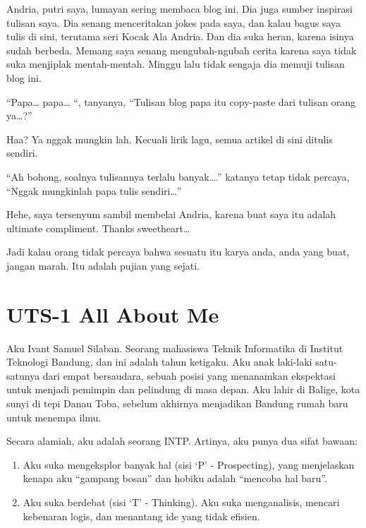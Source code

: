 \documentclass[
  letterpaper,
  DIV=11,
  numbers=noendperiod]{scrreprt}
\begin{document}
Andria, putri saya, lumayan sering membaca blog ini. Dia juga sumber
inspirasi tulisan saya. Dia senang menceritakan jokes pada saya, dan
kalau bagus saya tulis di sini, terutama seri Kocak Ala Andria. Dan dia
suka heran, karena isinya sudah berbeda. Memang saya senang
mengubah-ngubah cerita karena saya tidak suka menjiplak mentah-mentah.
Minggu lalu tidak sengaja dia memuji tulisan blog ini.

``Papa\ldots{} papa\ldots{} ``, tanyanya, ``Tulisan blog papa itu
copy-paste dari tulisan orang ya\ldots?''

Haa? Ya nggak mungkin lah. Kecuali lirik lagu, semua artikel di sini
ditulis sendiri.

``Ah bohong, soalnya tulisannya terlalu banyak\ldots.'' katanya tetap
tidak percaya, ``Nggak mungkinlah papa tulis sendiri\ldots{}''

Hehe, saya tersenyum sambil membelai Andria, karena buat saya itu adalah
ultimate compliment. Thanks sweetheart\ldots{}

Jadi kalau orang tidak percaya bahwa sesuatu itu karya anda, anda yang
buat, jangan marah. Itu adalah pujian yang sejati.


\chapter{UTS-1 All About Me}\label{uts-1-all-about-me}

Aku Ivant Samuel Silaban. Seorang mahasiswa Teknik Informatika di
Institut Teknologi Bandung, dan ini adalah tahun ketigaku. Aku anak
laki-laki satu-satunya dari empat bersaudara, sebuah posisi yang
menanamkan ekspektasi untuk menjadi pemimpin dan pelindung di masa
depan. Aku lahir di Balige, kota sunyi di tepi Danau Toba, sebelum
akhirnya menjadikan Bandung rumah baru untuk menempa ilmu.

Secara alamiah, aku adalah seorang INTP. Artinya, aku punya dua sifat
bawaan:

\begin{enumerate}
\def\labelenumi{\arabic{enumi}.}
\item
  Aku suka mengeksplor banyak hal (sisi `P' - Prospecting), yang
  menjelaskan kenapa aku ``gampang bosan'' dan hobiku adalah ``mencoba
  hal baru''.
\item
  Aku suka berdebat (sisi `T' - Thinking). Aku suka menganalisis,
  mencari kebenaran logis, dan menantang ide yang tidak efisien.
\end{enumerate}
\end{document}
